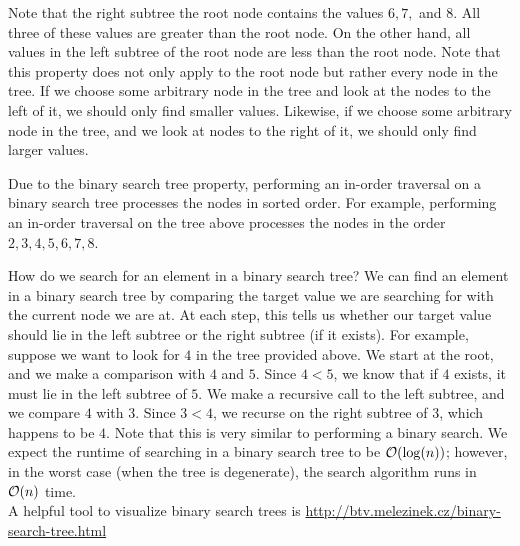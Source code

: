 Note that the right subtree the root node contains the values $6, 7,$ and $8$. All three of these values are greater than the root node. On the other hand, all values in the left subtree of the root node are less than the root node. Note that this property does not only apply to the root node but rather every node in the tree. If we choose some arbitrary node in the tree and look at the nodes to the left of it, we should only find smaller values. Likewise, if we choose some arbitrary node in the tree, and we look at nodes to the right of it, we should only find larger values. 

Due to the binary search tree property, performing an in-order traversal on a binary search tree processes the nodes in sorted order. For example, performing an in-order traversal on the tree above processes the nodes in the order $2, 3, 4, 5, 6, 7, 8$. 

How do we search for an element in a binary search tree? We can find an element in a binary search tree by comparing the target value we are searching for with the current node we are at. At each step, this tells us whether our target value should lie in the left subtree or the right subtree (if it exists). For example, suppose we want to look for $4$ in the tree provided above. We start at the root, and we make a comparison with $4$ and $5$. Since $4 < 5$, we know that if $4$ exists, it must lie in the left subtree of $5$. We make a recursive call to the left subtree, and we compare $4$ with $3$. Since $3 < 4$, we recurse on the right subtree of $3$, which happens to be $4$. Note that this is very similar to performing a binary search. We expect the runtime of searching in a binary search tree to be $\mathcal{O}(\log(n))$; however, in the worst case (when the tree is degenerate), the search algorithm runs in $\mathcal{O}(n)$ time. \\

A helpful tool to visualize binary search trees is \url{http://btv.melezinek.cz/binary-search-tree.html}